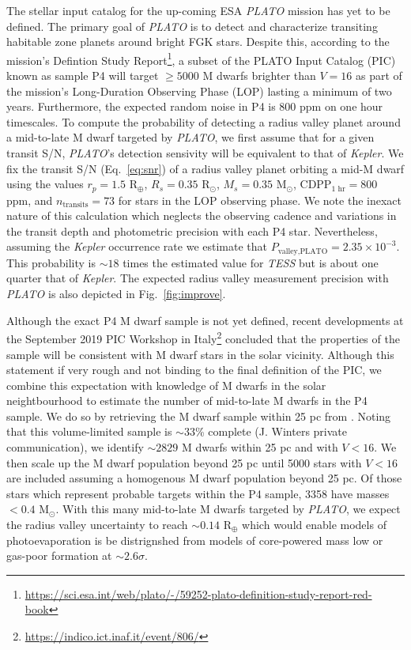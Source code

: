 \documentclass[twocolumn]{emulateapj}
\newcommand{\kepler}[1]{\emph{Kepler}#1}
\newcommand{\tess}[1]{\emph{TESS}#1}
\newcommand{\plato}[1]{\emph{PLATO}#1}
\begin{document}
The stellar input catalog for the up-coming ESA \plato{} mission \citep{rauer14} has yet to be defined. The primary goal
of \plato{} is to detect and characterize transiting habitable zone planets around bright FGK stars. Despite this,
according to the mission's Defintion Study
Report\footnote{\url{https://sci.esa.int/web/plato/-/59252-plato-definition-study-report-red-book}}, a subset of 
the PLATO Input Catalog (PIC) known as sample P4 will target $\geq 5000$ M dwarfs brighter than $V=16$ as part of
the mission's Long-Duration Observing Phase (LOP) lasting a minimum of two years. Furthermore, the expected random
noise in P4 is 800 ppm on one hour timescales. To compute the probability of
detecting a radius valley planet around a mid-to-late M dwarf targeted by \plato{,} we first assume that for a given
transit S/N, \plato{'s} detection sensivity will be equivalent to that of \kepler{.} We fix the transit S/N
(Eq.~\ref{eq:snr}) of a radius valley planet orbiting a mid-M dwarf using the values $r_p=1.5$ R$_{\oplus}$, $R_s=0.35$
R$_{\odot}$, $M_s=0.35$ M$_{\odot}$, CDPP$_{1\text{ hr}}=800$ ppm, and $n_{\text{transits}}=73$ for stars in the LOP observing
phase. We note the inexact nature of this calculation which
neglects the observing cadence and variations in the transit depth and photometric precision with each P4 star.
Nevertheless, assuming the \kepler{} occurrence rate we estimate that $P_{\text{valley,PLATO}}=2.35 \times 10^{-3}$. This
probability is $\sim 18$ times the estimated value for \tess{} but is about one quarter that of \kepler{.} The expected
radius valley measurement precision with \plato{} is also depicted in Fig.~\ref{fig:improve}. 

Although the exact P4 M dwarf sample is not yet defined, recent developments
at the September 2019 PIC Workshop in Italy\footnote{\url{https://indico.ict.inaf.it/event/806/}} concluded that the
properties of the sample will be consistent with M dwarf stars in the solar vicinity. Although this statement
if very rough and not binding to the final definition of the PIC, we combine this expectation with knowledge of M dwarfs
in the solar neightbourhood to estimate the number of mid-to-late M dwarfs in the P4 sample. We do so by retrieving
the M dwarf sample within 25 pc from \cite{winters19}. Noting that this volume-limited sample is $\sim 33$\% complete
(J. Winters private communication), we identify $\sim 2829$ M dwarfs within 25 pc and with $V<16$.
We then scale up the M dwarf population beyond 25 pc until 5000 stars with $V<16$ are included assuming a homogenous M
dwarf population beyond 25 pc. Of those stars which represent probable targets within the P4 sample, 3358 have masses
$<0.4$ M$_{\odot}$. With this many mid-to-late M dwarfs targeted by \plato{,} we expect the radius valley uncertainty
to reach $\sim 0.14$ R$_{\oplus}$ which would enable models of photoevaporation is be distrignshed from models of
core-powered mass low or gas-poor formation at $\sim 2.6\sigma$.
\end{document}
